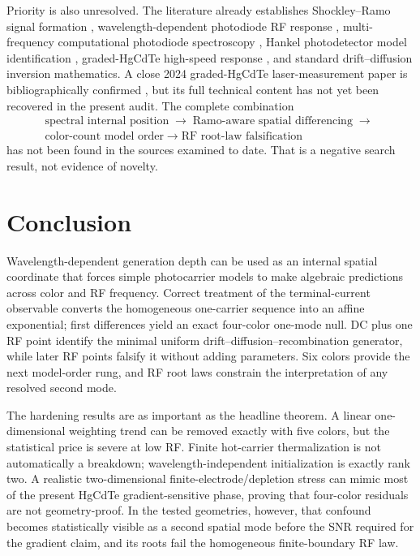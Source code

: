\documentclass[11pt]{article}
\begin{document}
Priority is also unresolved. The literature already establishes Shockley--Ramo signal formation \cite{Shockley1938,Ramo1939,Dabrowski1989}, wavelength-dependent photodiode RF response \cite{Glasser2021}, multi-frequency computational photodiode spectroscopy \cite{Kassa2026}, Hankel photodetector model identification \cite{Sun2025}, graded-HgCdTe high-speed response \cite{Sang2022}, and standard drift--diffusion inversion mathematics. A close 2024 graded-HgCdTe laser-measurement paper is bibliographically confirmed \cite{Xu2024Laser}, but its full technical content has not yet been recovered in the present audit. The complete combination
\[
\begin{gathered}
\text{spectral internal position}
\;\longrightarrow\;
\text{Ramo-aware spatial differencing}
\;\longrightarrow\;\\
\text{color-count model order}
\;\longrightarrow\;
\text{RF root-law falsification}
\end{gathered}
\]
has not been found in the sources examined to date. That is a negative search result, not evidence of novelty.

\section{Conclusion}
Wavelength-dependent generation depth can be used as an internal spatial coordinate that forces simple photocarrier models to make algebraic predictions across color and RF frequency. Correct treatment of the terminal-current observable converts the homogeneous one-carrier sequence into an affine exponential; first differences yield an exact four-color one-mode null. DC plus one RF point identify the minimal uniform drift--diffusion--recombination generator, while later RF points falsify it without adding parameters. Six colors provide the next model-order rung, and RF root laws constrain the interpretation of any resolved second mode.

The hardening results are as important as the headline theorem. A linear one-dimensional weighting trend can be removed exactly with five colors, but the statistical price is severe at low RF. Finite hot-carrier thermalization is not automatically a breakdown; wavelength-independent initialization is exactly rank two. A realistic two-dimensional finite-electrode/depletion stress can mimic most of the present HgCdTe gradient-sensitive phase, proving that four-color residuals are not geometry-proof. In the tested geometries, however, that confound becomes statistically visible as a second spatial mode before the SNR required for the gradient claim, and its roots fail the homogeneous finite-boundary RF law.
\end{document}
